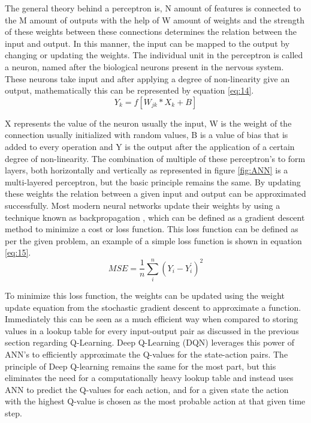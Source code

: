 The general theory behind a perceptron is, N amount of features is connected to the M amount of outputs with the help of W amount of weights and the strength of these weights between these connections determines the relation between the input and output. In this manner, the input can be mapped to the output by changing or updating the weights. The individual unit in the perceptron is called a neuron, named after the biological neurons present in the nervous system. These neurons take input and after applying a degree of non-linearity give an output, mathematically this can be represented by equation \ref{eq:14}. \\

\begin{equation}\label{eq:14}
    Y_k = \textit{f} [W_{jk} * X_k + B]
\end{equation}

X represents the value of the neuron usually the input, W is the weight of the connection usually initialized with random values, B is a value of bias that is added to every operation and Y is the output after the application of a certain degree of non-linearity. The combination of multiple of these perceptron's to form layers, both horizontally and vertically as represented in figure \ref{fig:ANN} is a multi-layered perceptron, but the basic principle remains the same. By updating these weights the relation between a given input and output can be approximated successfully. Most modern neural networks update their weights by using a technique known as backpropagation \cite{kelley1960gradient}, which can be defined as a gradient descent method to minimize a cost or loss function. This loss function can be defined as per the given problem, an example of a simple loss function is shown in equation \ref{eq:15}. \\

\begin{equation}\label{eq:15}
    MSE = \frac{1}{n} \sum_{i}^{n} (Y_i - Y_i^{'})^2
\end{equation}

To minimize this loss function, the weights can be updated using the weight update equation from the stochastic gradient descent \cite{ruder2016overview} to approximate a function. Immediately this can be seen as a much efficient way when compared to storing values in a lookup table for every input-output pair as discussed in the previous section regarding Q-Learning. Deep Q-Learning (DQN) \cite{mnih2013playing} leverages this power of ANN's to efficiently approximate the Q-values for the state-action pairs. The principle of Deep Q-learning remains the same for the most part, but this eliminates the need for a computationally heavy lookup table and instead uses ANN to predict the Q-values for each action, and for a given state the action with the highest Q-value is chosen as the most probable action at that given time step. \\

